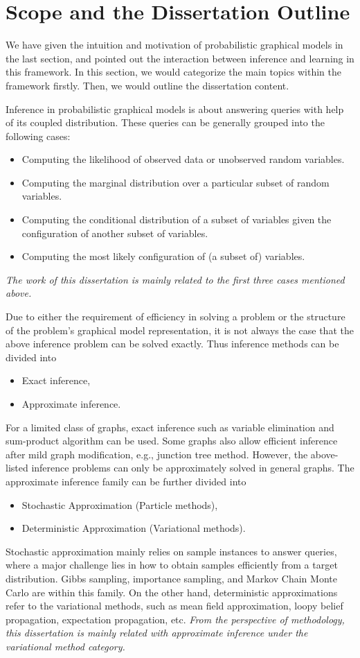 \section{Scope and the Dissertation Outline}\label{chpt1:sec:scope-outline}
We have given the intuition and motivation of probabilistic graphical models in the last section, and pointed out the interaction between inference and learning in this framework. In this section, we would categorize the main topics within the framework firstly. Then, we would outline the dissertation content.

Inference in probabilistic graphical models is about answering queries with help of its coupled distribution. These queries can be generally grouped into the following cases:
\begin{itemize}
\item Computing the likelihood of observed data or unobserved random variables.
\item Computing the marginal distribution over a particular subset of random variables.
\item Computing the conditional distribution of a subset of variables given the configuration of another subset of variables. 
\item Computing the most likely configuration of (a subset of) variables.
\end{itemize}
\textit{The work of this dissertation is mainly related to the first three cases mentioned above.}


Due to either the requirement of efficiency in solving a problem or the structure of the problem's graphical model representation, it is not always the case that the above inference problem can be solved exactly. Thus inference methods can be divided into
\begin{itemize}
\item Exact inference,
\item Approximate inference.
\end{itemize}
For a limited class of graphs, exact inference such as variable elimination and sum-product algorithm can be used. Some graphs also allow efficient inference after mild graph modification, e.g., junction tree method. However, the above-listed inference problems can only be approximately solved in general graphs. The approximate inference family can be further divided into
\begin{itemize}
\item Stochastic Approximation (Particle methods),
\item Deterministic Approximation (Variational methods).
\end{itemize}
Stochastic approximation mainly relies on sample instances to answer queries, where a major challenge lies in how to obtain samples efficiently from a target distribution. Gibbs sampling, importance sampling, and Markov Chain Monte Carlo are within this family. On the other hand, deterministic approximations refer to the variational methods, such as mean field approximation, loopy belief propagation, expectation propagation, etc. \textit{From the perspective of methodology, this dissertation is mainly related with approximate inference under the variational method category.}


